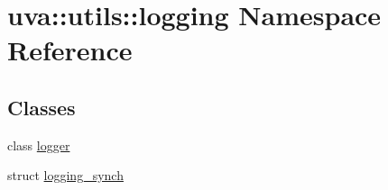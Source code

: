 \hypertarget{namespaceuva_1_1utils_1_1logging}{}\section{uva\+:\+:utils\+:\+:logging Namespace Reference}
\label{namespaceuva_1_1utils_1_1logging}
\subsection*{Classes}
\begin{DoxyCompactItemize}
\item 
class \hyperlink{classuva_1_1utils_1_1logging_1_1logger}{logger}
\item 
struct \hyperlink{structuva_1_1utils_1_1logging_1_1logging__synch}{logging\+\_\+synch}
\end{DoxyCompactItemize}
